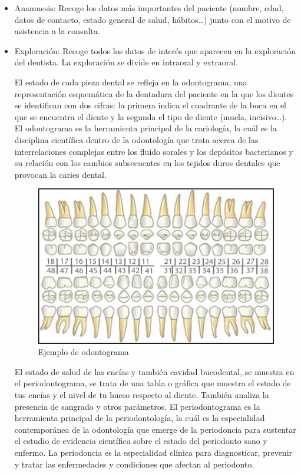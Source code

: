 \begin{itemize}
\item Anamnesis: Recoge los datos más importantes del paciente (nombre, edad, datos de contacto, estado general de salud, hábitos…) junto con el motivo de asistencia a la consulta.
            
\item Exploración: Recoge todos los datos de interés que aparecen en la exploración del dentista. La exploración se divide en intraoral y extraoral.
            
      El estado de cada pieza dental se refleja en la odontograma, una representación esquemática de la dentadura del paciente en la que los dientes se identifican con dos cifras: la primera indica el cuadrante de la boca en el que se encuentra el diente y la segunda el tipo de diente (muela, incisivo…). El odontograma es la herramienta principal de la cariología, la cuál es la disciplina científica dentro de la odontología que trata acerca de las interrelaciones complejas entre los fluido sorales y los depósitos bacterianos y su relación con los cambios subsecuentes en los tejidos duros dentales que provocan la caries dental.
            
      \begin{figure}[H]
      \centering
      \centerline{\includegraphics[width=12cm, keepaspectratio]{pictures/picture15.jpg}}
      \caption{Ejemplo de odontograma}
      \end{figure}
            
      El estado de salud de las encías y también cavidad bucodental, se muestra en el periodontograma, se trata de una tabla o gráfica que muestra el estado de tus encías y el nivel de tu hueso respecto al diente. También analiza la presencia de sangrado y otros parámetros. El periodontograma es la herramienta principal de la periodontología, la cuál es la especialidad contemporánea de la odontología que emerge de la periodoncia para sustentar el estudio de evidencia científica sobre el estado del periodonto sano y enfermo. La periodoncia es la especialidad clínica para diagnosticar, prevenir y tratar las enfermedades y condiciones que afectan al periodonto.
            

\end{itemize}

